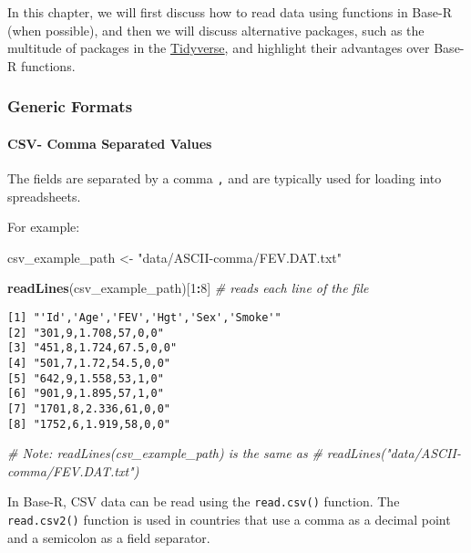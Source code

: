\documentclass[12pt,]{article}
\newenvironment{Shaded}{\begin{snugshade}}{\end{snugshade}}
\newcommand{\KeywordTok}[1]{\textcolor[rgb]{0.13,0.29,0.53}{\textbf{#1}}}
\newcommand{\DecValTok}[1]{\textcolor[rgb]{0.00,0.00,0.81}{#1}}
\newcommand{\StringTok}[1]{\textcolor[rgb]{0.31,0.60,0.02}{#1}}
\newcommand{\CommentTok}[1]{\textcolor[rgb]{0.56,0.35,0.01}{\textit{#1}}}
\newcommand{\OperatorTok}[1]{\textcolor[rgb]{0.81,0.36,0.00}{\textbf{#1}}}
\newcommand{\NormalTok}[1]{#1}
\let\oldparagraph\paragraph
\renewcommand{\paragraph}[1]{\oldparagraph{#1}\mbox{}}
\theoremstyle{definition}
\theoremstyle{definition}
\theoremstyle{definition}
\theoremstyle{remark}
\begin{document}
In this chapter, we will first discuss how to read data using functions
in Base-R (when possible), and then we will discuss alternative
packages, such as the multitude of packages in the
\href{https://www.tidyverse.org}{Tidyverse}, and highlight their
advantages over Base-R functions.

\subsubsection{Generic Formats}\label{generic-formats}

\paragraph{CSV- Comma Separated
Values}\label{csv--comma-separated-values}

The fields are separated by a comma \texttt{,} and are typically used
for loading into spreadsheets.

For example:

\begin{Shaded}
\begin{Highlighting}[]
\NormalTok{csv_example_path <-}\StringTok{ "data/ASCII-comma/FEV.DAT.txt"}

\KeywordTok{readLines}\NormalTok{(csv_example_path)[}\DecValTok{1}\OperatorTok{:}\DecValTok{8}\NormalTok{]  }\CommentTok{# reads each line of the file}
\end{Highlighting}
\end{Shaded}

\begin{verbatim}
[1] "'Id','Age','FEV','Hgt','Sex','Smoke'"
[2] "301,9,1.708,57,0,0"                  
[3] "451,8,1.724,67.5,0,0"                
[4] "501,7,1.72,54.5,0,0"                 
[5] "642,9,1.558,53,1,0"                  
[6] "901,9,1.895,57,1,0"                  
[7] "1701,8,2.336,61,0,0"                 
[8] "1752,6,1.919,58,0,0"                 
\end{verbatim}

\begin{Shaded}
\begin{Highlighting}[]
\CommentTok{# Note: readLines(csv_example_path) is the same as}
\CommentTok{# readLines("data/ASCII-comma/FEV.DAT.txt")}
\end{Highlighting}
\end{Shaded}

In Base-R, CSV data can be read using the \texttt{read.csv()} function.
The \texttt{read.csv2()} function is used in countries that use a comma
as a decimal point and a semicolon as a field separator.
\end{document}
